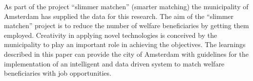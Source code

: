 As part of the project “slimmer matchen” (smarter matching) the municipality of Amsterdam has supplied the data for this research. 
The aim of the “slimmer matchen”  project is to reduce the number of welfare beneficiaries by getting them employed.
Creativity in applying novel technologies is conceived by the municipality to play an important role in achieving the objectives.
The learnings described in this paper can provide the city of Amsterdam with guidelines for the implementation of an intelligent and data driven system to match welfare beneficiaries with job opportunities. 



